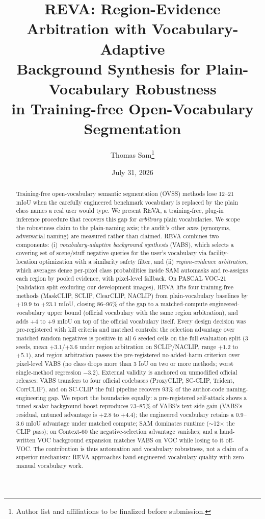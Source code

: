 \documentclass[11pt]{article}
\title{REVA: Region-Evidence Arbitration with Vocabulary-Adaptive\\
Background Synthesis for Plain-Vocabulary Robustness\\
in Training-free Open-Vocabulary Segmentation}
\author{Thomas Sam\thanks{Author list and affiliations to be finalized before submission.}}
\date{July 31, 2026}
\newcommand{\miou}{mIoU}
\newcommand{\reva}{REVA}
\begin{document}
\maketitle

\begin{abstract}
Training-free open-vocabulary semantic segmentation (OVSS) methods lose 12--21 \miou{}
when the carefully engineered benchmark vocabulary is replaced by the plain class names
a real user would type. We present \reva{}, a training-free, plug-in inference procedure
that recovers this gap for \emph{arbitrary} plain vocabularies. We scope the
robustness claim to the plain-naming axis; the audit's other axes (synonyms,
adversarial naming) are measured rather than claimed. \reva{} combines two
components: (i) \emph{vocabulary-adaptive background synthesis} (VABS), which selects a
covering set of scene/stuff negative queries for the user's vocabulary via
facility-location optimization with a similarity safety filter, and (ii)
\emph{region-evidence arbitration}, which averages dense per-pixel class probabilities
inside SAM automasks and re-assigns each region by pooled evidence, with pixel-level
fallback. On PASCAL VOC-21 (validation split excluding our development images),
\reva{} lifts four training-free methods (MaskCLIP, SCLIP, ClearCLIP, NACLIP) from
plain-vocabulary baselines by $+19.9$ to $+23.1$ \miou{}, closing 86--96\% of the gap to
a matched-compute engineered-vocabulary upper bound (official vocabulary with the same
region arbitration), and adds $+4$ to $+9$ \miou{} on top of the official
vocabulary itself. Every design decision was pre-registered with kill criteria and matched
controls: the selection advantage over matched random negatives is
positive in all 6 seeded cells on the full evaluation split (3 seeds, mean
$+3.1$/$+3.6$ under region arbitration on SCLIP/NACLIP, range $+1.2$ to
$+5.1$), and region arbitration
passes the pre-registered no-added-harm criterion over pixel-level VABS
(no class drops more than 3 IoU on two or more methods; worst single-method
regression $-3.2$). External validity is anchored on unmodified official
releases: VABS transfers to four official codebases (ProxyCLIP, SC-CLIP,
Trident, CorrCLIP), and on SC-CLIP the full pipeline recovers 93\% of the
author-code naming-engineering gap. We report the boundaries equally: a
pre-registered self-attack shows a tuned scalar background boost reproduces
73--85\% of VABS's text-side gain (VABS's residual, untuned advantage is
$+2.8$ to $+4.4$); the engineered vocabulary retains a 0.9--3.6 \miou{}
advantage under matched compute; SAM dominates runtime
($\sim$12$\times$ the CLIP pass); on Context-60 the negative-selection
advantage vanishes; and a hand-written VOC background expansion matches VABS
on VOC while losing to it off-VOC. The contribution is thus automation and
vocabulary robustness, not a claim of a superior mechanism: \reva{} approaches
hand-engineered-vocabulary quality with zero manual vocabulary work.
\end{abstract}
\end{document}
